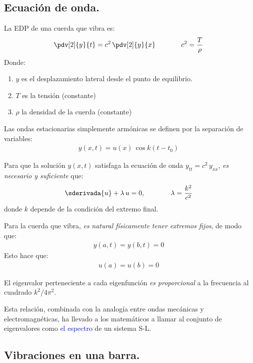 \subsection{Ecuación de onda.}

La EDP de una cuerda que vibra es:
\begin{align*}
\pdv[2]{y}{t} = c^{2} \, \pdv[2]{y}{x} \hspace{1.3cm} c^{2} = \dfrac{T}{\rho}
\end{align*}
Donde:
\begin{enumerate}[label=\roman*)]
\item $y$ es el desplazamiento lateral desde el punto de equilibrio.
\item $T$ es la tensión (constante)
\item $\rho$ la densidad de la cuerda (constante)
\end{enumerate}

Las ondas estacionarias simplemente armónicas se definen por la separación de variables:
\begin{align*}
y (x, t) = u (x) \, \cos k(t - t_{0})
\end{align*}

Para que la solución $y (x, t)$ satisfaga la ecuación de onda $y_{tt} = c^{2} \, y_{xx}$,  \emph{es necesario y suficiente} que:
\begin{align*}
\sderivada{u} + \lambda \, u = 0, \hspace{1.3cm} \lambda = \dfrac{k^{2}}{c^{2}}
\end{align*}
donde $k$ depende de la condición del extremo final.
\par
Para la cuerda que vibra,  \emph{es natural físicamente tener extremos fijos}, de modo que:
\begin{align*}
y (a, t) = y (b, t) = 0
\end{align*}
Esto hace que:
\begin{align*}
u (a) = u (b) = 0
\end{align*}

El eigenvalor perteneciente a cada eigenfunción \emph{es proporcional} a la frecuencia al cuadrado $k^{2}/4 \pi^{2}$.
\par
Esta relación, combinada con la analogía entre ondas mecánicas y electromagnéticas, ha llevado a los matemáticos a llamar al conjunto de eigenvalores como \textcolor{blue}{el espectro} de un sistema S-L.

\subsection{Vibraciones en una barra.}


